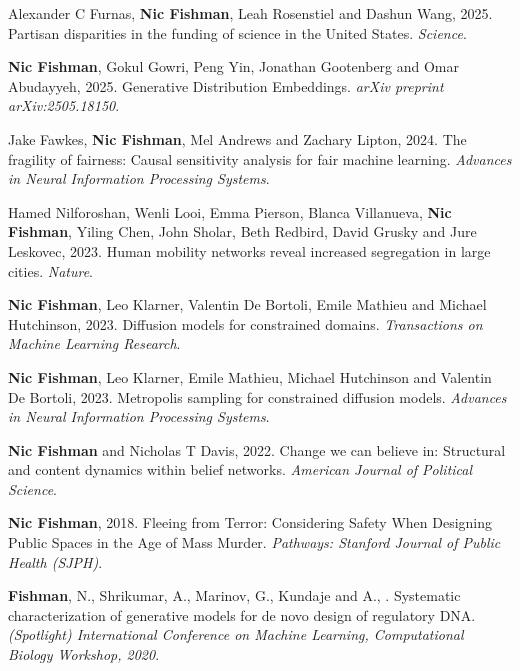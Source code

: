 \begin{cvparagraph}


\begin{addmargin}[2em]{0em}

Alexander C Furnas, \textbf{Nic Fishman}, Leah Rosenstiel and Dashun Wang, 2025. Partisan disparities in the funding of science in the United States. \textit{Science}.

\textbf{Nic Fishman}, Gokul Gowri, Peng Yin, Jonathan Gootenberg and Omar Abudayyeh, 2025. Generative Distribution Embeddings. \textit{arXiv preprint arXiv:2505.18150}.

Jake Fawkes, \textbf{Nic Fishman}, Mel Andrews and Zachary Lipton, 2024. The fragility of fairness: Causal sensitivity analysis for fair machine learning. \textit{Advances in Neural Information Processing Systems}.

Hamed Nilforoshan, Wenli Looi, Emma Pierson, Blanca Villanueva, \textbf{Nic Fishman}, Yiling Chen, John Sholar, Beth Redbird, David Grusky and Jure Leskovec, 2023. Human mobility networks reveal increased segregation in large cities. \textit{Nature}.

\textbf{Nic Fishman}, Leo Klarner, Valentin De Bortoli, Emile Mathieu and Michael Hutchinson, 2023. Diffusion models for constrained domains. \textit{Transactions on Machine Learning Research}.

\textbf{Nic Fishman}, Leo Klarner, Emile Mathieu, Michael Hutchinson and Valentin De Bortoli, 2023. Metropolis sampling for constrained diffusion models. \textit{Advances in Neural Information Processing Systems}.

\textbf{Nic Fishman} and Nicholas T Davis, 2022. Change we can believe in: Structural and content dynamics within belief networks. \textit{American Journal of Political Science}.

\textbf{Nic Fishman}, 2018. Fleeing from Terror: Considering Safety When Designing Public Spaces in the Age of Mass Murder. \textit{Pathways: Stanford Journal of Public Health (SJPH)}.

\textbf{Fishman}, N., Shrikumar, A., Marinov, G., Kundaje and A., . Systematic characterization of generative models for de novo design of regulatory DNA. \textit{(Spotlight) International Conference on Machine Learning, Computational Biology Workshop, 2020}.


\end{addmargin}
\end{cvparagraph}
